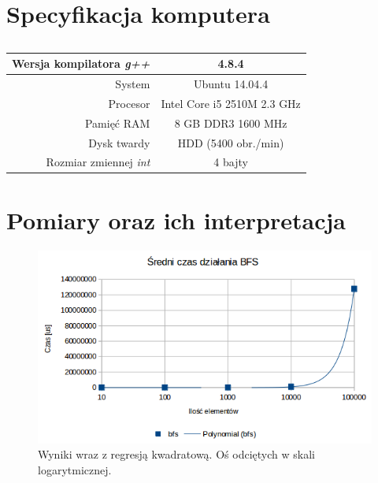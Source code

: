 \documentclass[11pt,a4paper]{article}
\begin{document}
\newpage

\section{Specyfikacja komputera}

\begin{table}[htbp]
\caption{}
\begin{center}
	\begin{tabular}{| r | c |}
	\hline
	Wersja kompilatora \textit{g++} & 4.8.4 \\ \hline
	System & Ubuntu 14.04.4 \\ \hline
	Procesor	 & Intel Core i5 2510M 2.3 GHz \\ \hline
	Pamięć RAM & 8 GB DDR3 1600 MHz \\ \hline
	Dysk twardy & HDD (5400 obr./min) \\ \hline
	Rozmiar zmiennej \textit{int} & 4 bajty \\ \hline
	\end{tabular}
\end{center}
\label{specyfikacja}
\end{table}

\section{Pomiary oraz ich interpretacja}


\begin{figure}[htbp]
\begin{center}
	\includegraphics[scale=0.7]{../wyniki/BFS.png}
\end{center}
\caption{Wyniki wraz z regresją kwadratową. Oś odciętych w skali logarytmicznej.}
\end{figure}
\end{document}
